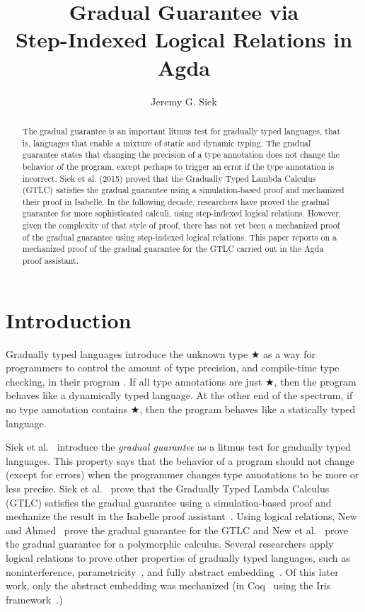 \documentclass[submission,copyright,creativecommons]{eptcs}
\title{Gradual Guarantee via \\ Step-Indexed Logical Relations in Agda}
\author{Jeremy G. Siek
\institute{School of Informatics, Computing, and Engineering\\
Indiana University \\
Bloomington, IN, USA}
\email{jsiek@iu.edu}
}
\begin{document}
\maketitle

\begin{abstract}
  The gradual guarantee is an important litmus test for gradually
  typed languages, that is, languages that enable a mixture of static
  and dynamic typing. The gradual guarantee states that changing the
  precision of a type annotation does not change the behavior of the
  program, except perhaps to trigger an error if the type annotation
  is incorrect. Siek et al. (2015) proved that the Gradually Typed
  Lambda Calculus (GTLC) satisfies the gradual guarantee using a
  simulation-based proof and mechanized their proof in Isabelle. In
  the following decade, researchers have proved the gradual guarantee
  for more sophisticated calculi, using step-indexed logical
  relations.  However, given the complexity of that style of proof,
  there has not yet been a mechanized proof of the gradual guarantee
  using step-indexed logical relations. This paper reports on a
  mechanized proof of the gradual guarantee for the GTLC carried out
  in the Agda proof assistant.
\end{abstract}

\section{Introduction}

Gradually typed languages introduce the unknown type ★ as a way for
programmers to control the amount of type precision, and compile-time
type checking, in their program \cite{Siek:2006bh,Siek:2007qy}. If all
type annotations are just ★, then the program behaves like a
dynamically typed language. At the other end of the spectrum, if no
type annotation contains ★, then the program behaves like a statically
typed language.

Siek et al.~\cite{Siek:2015ac} introduce the \emph{gradual guarantee}
as a litmus test for gradually typed languages.  This property says
that the behavior of a program should not change (except for errors)
when the programmer changes type annotations to be more or less
precise.  Siek et al.~\cite{Siek:2015ac} prove that the Gradually
Typed Lambda Calculus (GTLC) satisfies the gradual guarantee using a
simulation-based proof and mechanize the result in the Isabelle proof
assistant~\cite{Nipkow:2002jl}. Using logical relations, New and
Ahmed~\cite{New:2018aa} prove the gradual guarantee for the GTLC and
New et al.~\cite{New:2019ab} prove the gradual guarantee for a
polymorphic calculus. Several researchers apply logical relations to
prove other properties of gradually typed languages, such as
noninterference\cite{Toro:2018aa},
parametricity~\cite{Ahmed:2011fk,New:2019ab,Labrada:2020tk}, and fully
abstract embedding~\cite{Jacobs:2021aa}. Of this later work, only the
abstract embedding was mechanized (in
Coq~\cite{The-Coq-Development-Team:2004kf} using the Iris
framework~\cite{JUNG:2018aa}.)
\end{document}
